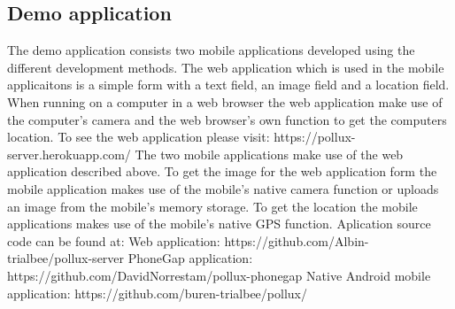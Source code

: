 \documentclass{./tex/cslthse-msc}
\begin{document}
\subsection{Demo application}
The demo application consists two mobile applications developed using the different development methods. The web application which is used in the mobile applicaitons is a simple form with a text field, an image field and a location field.
\newline\newline
When running on a computer in a web browser the web application make use of the computer's camera and the web browser's own function to get the computers location. To see the web application please visit: https://pollux-server.herokuapp.com/
\newline\newline
The two mobile applications make use of the web application described above. To get the image for the web application form the mobile application makes use of the mobile's native camera function or uploads an image from the mobile's memory storage. To get the location the mobile applications makes use of the mobile's native GPS function. 
\newline\newline
Aplication source code can be found at:
\newline
Web application: https://github.com/Albin-trialbee/pollux-server
\newline
PhoneGap application: https://github.com/DavidNorrestam/pollux-phonegap
\newline
Native Android mobile application: https://github.com/buren-trialbee/pollux/
\end{document}
